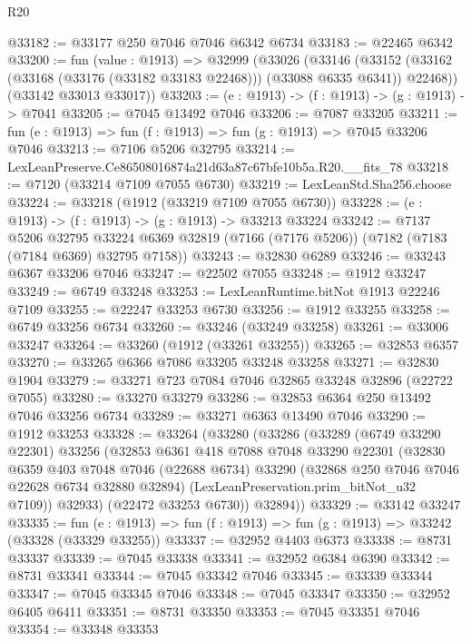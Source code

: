 \begin{lexlean}{R20}
\begin{coremodule}
{@33182 := @33177 @250 @7046 @7046 @6342 @6734
@33183 := @22465 @6342
@33200 := fun (value : @1913) =>
  @32999
    (@33026
      (@33146
        (@33152 (@33162 (@33168 (@33176 (@33182 @33183 @22468))) (@33088 @6335 @6341)) @22468))
      (@33142 @33013 @33017))
@33203 := (e : @1913) -> (f : @1913) -> (g : @1913) -> @7041
@33205 := @7045 @13492 @7046
@33206 := @7087 @33205
@33211 := fun (e : @1913) => fun (f : @1913) => fun (g : @1913) => @7045 @33206 @7046
@33213 := @7106 @5206 @32795
@33214 := LexLeanPreserve.Ce86508016874a21d63a87c67bfe10b5a.R20.__fits_78
@33218 := @7120 (@33214 @7109 @7055 @6730)
@33219 := LexLeanStd.Sha256.choose
@33224 := @33218 (@1912 (@33219 @7109 @7055 @6730))
@33228 := (e : @1913) -> (f : @1913) -> (g : @1913) -> @33213 @33224
@33242 := @7137
    @5206
    @32795
    @33224
    @6369
    @32819
    (@7166 (@7176 @5206))
    (@7182 (@7183 (@7184 @6369) @32795 @7158))
@33243 := @32830 @6289
@33246 := @33243 @6367 @33206 @7046
@33247 := @22502 @7055
@33248 := @1912 @33247
@33249 := @6749 @33248
@33253 := LexLeanRuntime.bitNot @1913 @22246 @7109
@33255 := @22247 @33253 @6730
@33256 := @1912 @33255
@33258 := @6749 @33256 @6734
@33260 := @33246 (@33249 @33258)
@33261 := @33006 @33247
@33264 := @33260 (@1912 (@33261 @33255))
@33265 := @32853 @6357
@33270 := @33265 @6366 @7086 @33205 @33248 @33258
@33271 := @32830 @1904
@33279 := @33271 @723 @7084 @7046 @32865 @33248 @32896 (@22722 @7055)
@33280 := @33270 @33279
@33286 := @32853 @6364 @250 @13492 @7046 @33256 @6734
@33289 := @33271 @6363 @13490 @7046
@33290 := @1912 @33253
@33328 := @33264
    (@33280
      (@33286
        (@33289
          (@6749 @33290 @22301)
          @33256
          (@32853
            @6361
            @418
            @7088
            @7048
            @33290
            @22301
            (@32830
              @6359
              @403
              @7048
              @7046
              (@22688 @6734)
              @33290
              (@32868 @250 @7046 @7046 @22628 @6734 @32880 @32894)
              (LexLeanPreservation.prim_bitNot_u32 @7109))
            @32933)
          (@22472 @33253 @6730))
        @32894))
@33329 := @33142 @33247
@33335 := fun (e : @1913) => fun (f : @1913) => fun (g : @1913) => @33242 (@33328 (@33329 @33255))
@33337 := @32952 @4403 @6373
@33338 := @8731 @33337
@33339 := @7045 @33338
@33341 := @32952 @6384 @6390
@33342 := @8731 @33341
@33344 := @7045 @33342 @7046
@33345 := @33339 @33344
@33347 := @7045 @33345 @7046
@33348 := @7045 @33347
@33350 := @32952 @6405 @6411
@33351 := @8731 @33350
@33353 := @7045 @33351 @7046
@33354 := @33348 @33353
}
\end{coremodule}
\end{lexlean}
